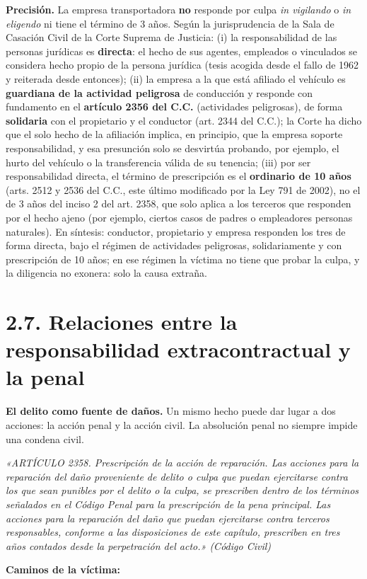 \begin{precision}
\textcolor[HTML]{9C2B2B}{\textbf{Precisión. }}La empresa transportadora \textbf{no} responde por culpa \textit{in vigilando} o \textit{in eligendo} ni tiene el término de 3 años. Según la jurisprudencia de la Sala de Casación Civil de la Corte Suprema de Justicia: (i) la responsabilidad de las personas jurídicas es \textbf{directa}: el hecho de sus agentes, empleados o vinculados se considera hecho propio de la persona jurídica (tesis acogida desde el fallo de 1962 y reiterada desde entonces); (ii) la empresa a la que está afiliado el vehículo es \textbf{guardiana de la actividad peligrosa} de conducción y responde con fundamento en el \textbf{artículo 2356 del C.C.} (actividades peligrosas), de forma \textbf{solidaria} con el propietario y el conductor (art. 2344 del C.C.); la Corte ha dicho que el solo hecho de la afiliación implica, en principio, que la empresa soporte responsabilidad, y esa presunción solo se desvirtúa probando, por ejemplo, el hurto del vehículo o la transferencia válida de su tenencia; (iii) por ser responsabilidad directa, el término de prescripción es el \textbf{ordinario de 10 años} (arts. 2512 y 2536 del C.C., este último modificado por la Ley 791 de 2002), no el de 3 años del inciso 2 del art. 2358, que solo aplica a los terceros que responden por el hecho ajeno (por ejemplo, ciertos casos de padres o empleadores personas naturales). En síntesis: conductor, propietario y empresa responden los tres de forma directa, bajo el régimen de actividades peligrosas, solidariamente y con prescripción de 10 años; en ese régimen la víctima no tiene que probar la culpa, y la diligencia no exonera: solo la causa extraña.
\end{precision}
\section{2.7. Relaciones entre la responsabilidad extracontractual y la penal}
\textbf{El delito como fuente de daños.} Un mismo hecho puede dar lugar a dos acciones: la acción penal y la acción civil. La absolución penal no siempre impide una condena civil.

\begin{cita}
\textit{«ARTÍCULO 2358. Prescripción de la acción de reparación. Las acciones para la reparación del daño proveniente de delito o culpa que puedan ejercitarse contra los que sean punibles por el delito o la culpa, se prescriben dentro de los términos señalados en el Código Penal para la prescripción de la pena principal. Las acciones para la reparación del daño que puedan ejercitarse contra terceros responsables, conforme a las disposiciones de este capítulo, prescriben en tres años contados desde la perpetración del acto.» (Código Civil)}
\end{cita}
\textbf{Caminos de la víctima:}

